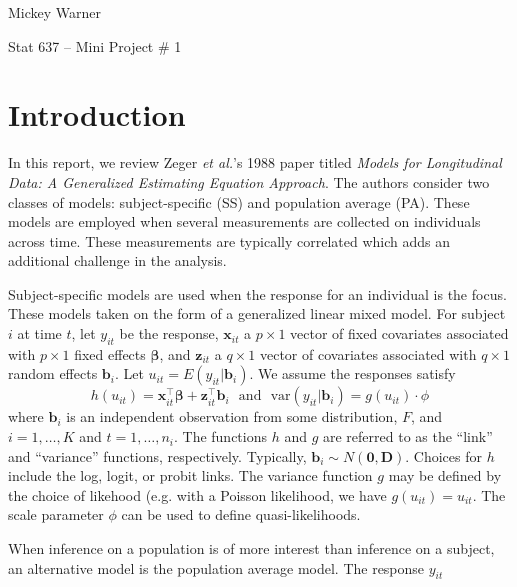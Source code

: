 \documentclass[12pt]{article}
\newcommand{\m}[1]{\mathbf{\bm{#1}}}
\newcommand{\var}{\mathrm{var}}
\begin{document}
\noindent Mickey Warner
\bigskip

\noindent Stat 637 -- Mini Project \# 1

\section*{Introduction}

\noindent In this report, we review Zeger \emph{et al.}'s 1988 paper titled \emph{Models for Longitudinal Data: A Generalized Estimating Equation Approach}. The authors consider two classes of models: subject-specific (SS) and population average (PA). These models are employed when several measurements are collected on individuals across time. These measurements are typically correlated which adds an additional challenge in the analysis.
\bigskip

\noindent Subject-specific models are used when the response for an individual is the focus. These models taken on the form of a generalized linear mixed model. For subject $i$ at time $t$, let $y_{it}$ be the response, $\m{x}_{it}$ a $p\times 1$ vector of fixed covariates associated with $p\times 1$ fixed effects $\m{\beta}$, and $\m{z}_{it}$ a $q\times 1$ vector of covariates associated with $q\times 1$ random effects $\m{b}_i$. Let $u_{it}=E(y_{it}|\m{b}_i)$. We assume the responses satisfy
\[ h(u_{it}) = \m{x}_{it}^\top\m{\beta} + \m{z}_{it}^\top\m{b}_i ~~~\mathrm{and}~~~ \var(y_{it}|\m{b}_i) = g(u_{it})\cdot \phi \]
where $\m{b}_i$ is an independent observation from some distribution, $F$, and $i=1,\ldots,K$ and $t=1,\ldots,n_i$. The functions $h$ and $g$ are referred to as the ``link'' and ``variance'' functions, respectively. Typically, $\m{b}_i\sim N(\m{0}, \m{D})$. Choices for $h$ include the log, logit, or probit links. The variance function $g$ may be defined by the choice of likehood (e.g. with a Poisson likelihood, we have $g(u_{it})=u_{it}$. The scale parameter $\phi$ can be used to define quasi-likelihoods.
\bigskip

\noindent When inference on a population is of more interest than inference on a subject, an alternative model is the population average model. The response $y_{it}$
\end{document}
